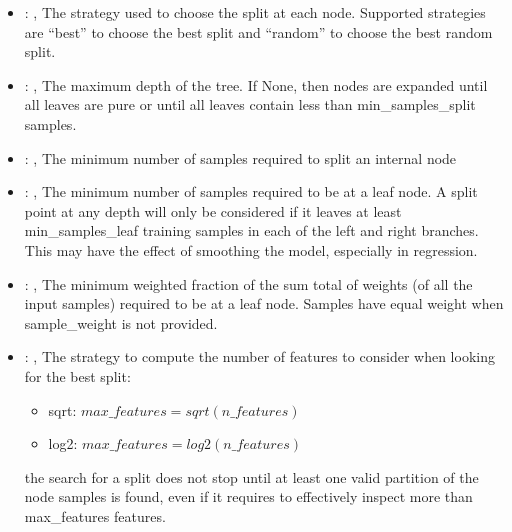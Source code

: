 \begin{itemize}
    \item {}: ,
      The strategy used to choose the split at each node. Supported strategies are ``best''
      to choose the best split and ``random'' to choose the best random split.

    \item {}: ,
      The maximum depth of the tree. If None, then nodes are expanded until all leaves are pure
      or until all leaves contain less than min\_samples\_split samples.

    \item {}: ,
      The minimum number of samples required to split an internal node

    \item {}: ,
      The minimum number of samples required to be at a leaf node. A split point at any
      depth will only be considered if it leaves at least min\_samples\_leaf training samples in
      each                                                  of the left and right branches. This may
      have the effect of smoothing the model, especially
      in regression.

    \item {}: ,
      The minimum weighted fraction of the sum total of weights (of all the input samples)
      required to be at a leaf node. Samples have equal weight when sample\_weight is not provided.

    \item {}: ,
      The strategy to compute the number of features to consider when looking for the best split:
      \begin{itemize}                                                     \item sqrt:
      $max\_features=sqrt(n\_features)$                                                     \item
      log2: $max\_features=log2(n\_features)$
      \end{itemize}                                                   \nb the search for a split
      does not stop until at least one valid partition of the node
      samples is found, even if it requires to effectively inspect more than max\_features features.


\end{itemize}
